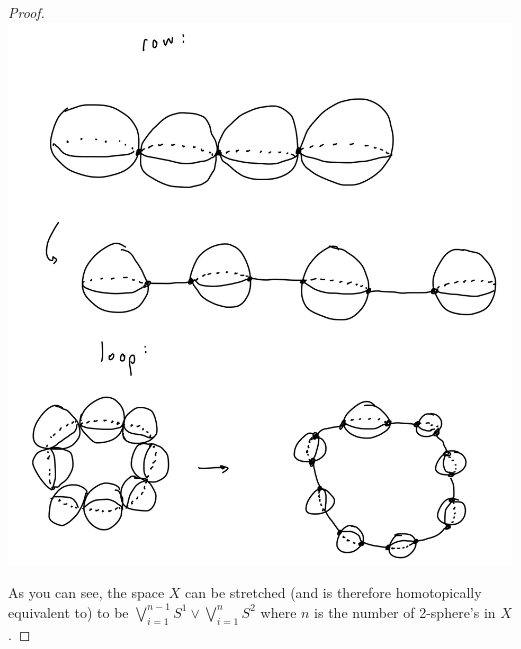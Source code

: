 \documentclass[12pt]{article}
\begin{document}
\begin{proof}
    \par \includegraphics[scale=.2]{2.3.2.png}
    \par As you can see, the space $X$ can be stretched (and is therefore homotopically equivalent to) to be $\bigvee_{i=1}^{n-1} S^1 \vee \bigvee_{i=1}^{n} S^2$ where $n$ is the number of 2-sphere's in $X$. 
\end{proof}
\end{document}
